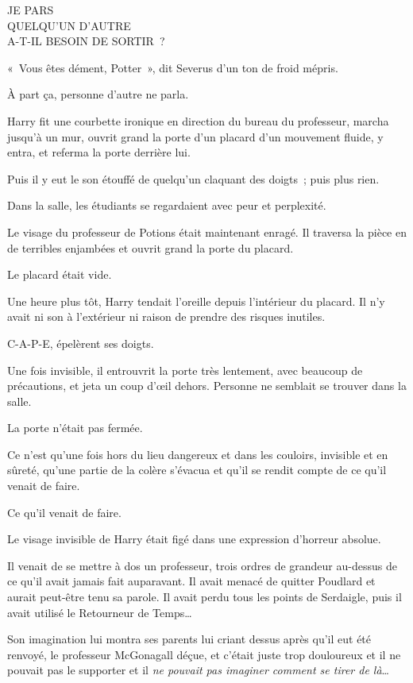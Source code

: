 \begin{writtenNote}
JE PARS\\
QUELQU'UN D'AUTRE\\
A-T-IL BESOIN DE SORTIR~?
\end{writtenNote}

«~Vous êtes dément, Potter~», dit Severus d'un ton de froid mépris.

À part ça, personne d'autre ne parla.

Harry fit une courbette ironique en direction du bureau du professeur, marcha jusqu'à un mur, ouvrit grand la porte d'un placard d'un mouvement fluide, y entra, et referma la porte derrière lui.

Puis il y eut le son étouffé de quelqu'un claquant des doigts~; puis plus rien.

Dans la salle, les étudiants se regardaient avec peur et perplexité.

Le visage du professeur de Potions était maintenant enragé. Il traversa la pièce en de terribles enjambées et ouvrit grand la porte du placard.

Le placard était vide.

\later

Une heure plus tôt, Harry tendait l'oreille depuis l'intérieur du placard. Il n'y avait ni son à l'extérieur ni raison de prendre des risques inutiles.

C-A-P-E, épelèrent ses doigts.

Une fois invisible, il entrouvrit la porte très lentement, avec beaucoup de précautions, et jeta un coup d'œil dehors. Personne ne semblait se trouver dans la salle.

La porte n'était pas fermée.

Ce n'est qu'une fois hors du lieu dangereux et dans les couloirs, invisible et en sûreté, qu'une partie de la colère s'évacua et qu'il se rendit compte de ce qu'il venait de faire.

Ce qu'il venait de faire.

Le visage invisible de Harry était figé dans une expression d'horreur absolue.

Il venait de se mettre à dos un professeur, trois ordres de grandeur au-dessus de ce qu'il avait jamais fait auparavant. Il avait menacé de quitter Poudlard et aurait peut-être tenu sa parole. Il avait perdu tous les points de Serdaigle, puis il avait utilisé le Retourneur de Temps…

Son imagination lui montra ses parents lui criant dessus après qu'il eut été renvoyé, le professeur McGonagall déçue, et c'était juste trop douloureux et il ne pouvait pas le supporter et il \emph{ne pouvait pas imaginer comment se tirer de là}…

